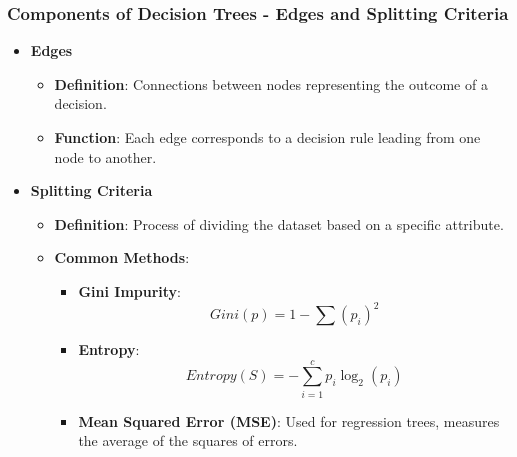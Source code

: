 \documentclass{beamer}
\begin{document}
\begin{frame}[fragile]
    \frametitle{Components of Decision Trees - Edges and Splitting Criteria}
    \begin{itemize}
        \item \textbf{Edges}
            \begin{itemize}
                \item \textbf{Definition}: Connections between nodes representing the outcome of a decision.
                \item \textbf{Function}: Each edge corresponds to a decision rule leading from one node to another.
            \end{itemize}
        \item \textbf{Splitting Criteria}
            \begin{itemize}
                \item \textbf{Definition}: Process of dividing the dataset based on a specific attribute.
                \item \textbf{Common Methods}:
                    \begin{itemize}
                        \item \textbf{Gini Impurity}:
                        \begin{equation}
                            Gini(p) = 1 - \sum (p_i)^2
                        \end{equation}
                        
                        \item \textbf{Entropy}:
                        \begin{equation}
                            Entropy(S) = -\sum_{i=1}^c p_i \log_2(p_i)
                        \end{equation}
                        
                        \item \textbf{Mean Squared Error (MSE)}: Used for regression trees, measures the average of the squares of errors.
                    \end{itemize}
            \end{itemize}
    \end{itemize}
\end{frame}
\end{document}
